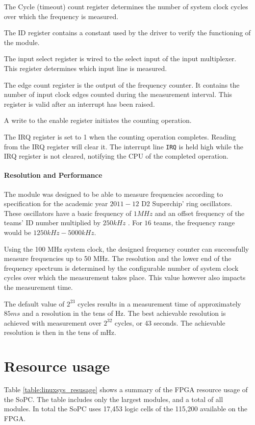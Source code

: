 The Cycle (timeout) count register determines the number of system
clock cycles over which the frequency is measured.

The ID register contains a constant used by the driver to verify the functioning
of the module.

The input select register is wired to the select input of the input multiplexer. This
register determines which input line is measured.

The edge count register is the output of the frequency counter. It contains the number
of input clock edges counted during the measurement interval. This register is valid
after an interrupt has been raised.

A write to the enable register initiates the counting operation.

The IRQ register is set to 1 when the counting operation completes. Reading from
the IRQ register will clear it. The interrupt line \texttt{IRQ} is held high
while the IRQ register is not cleared, notifying the CPU of the completed operation.


\paragraph{Resolution and Performance}
The module was designed to be able to measure frequencies according to specification
for the academic year $2011-12$ D2 Superchip' ring oscillators.
These oscillators have a basic frequency of $1MHz$ and an offset frequency of the teams' ID number
multiplied by $250kHz$ \citep{Southampton:2011:spec}. For $16$ teams, the frequency
range would be $1250kHz - 5000kHz$.

Using the 100 MHz system clock, the designed frequency counter can successfully measure frequencies up to
50 MHz. The resolution and the lower end of the frequency spectrum is determined by the configurable
number of system clock cycles over which the measurement takes place. This value however also impacts
the measurement time.

The default value of $2^{23}$ cycles results in a measurement time of approximately $85 ms$ and a resolution
in the tens of Hz. The best achievable resolution is achieved with measurement over $2^{32}$ cycles, or
43 seconds. The achievable resolution is then in the tens of mHz.





\newpage
\section{Resource usage}
Table \ref{table:linuxsys_resusage} shows a summary of the FPGA resource usage of the SoPC. The table includes only
the largest modules, and a total of all modules. In total the SoPC uses 17,453 logic cells of the
115,200 available on the FPGA.

